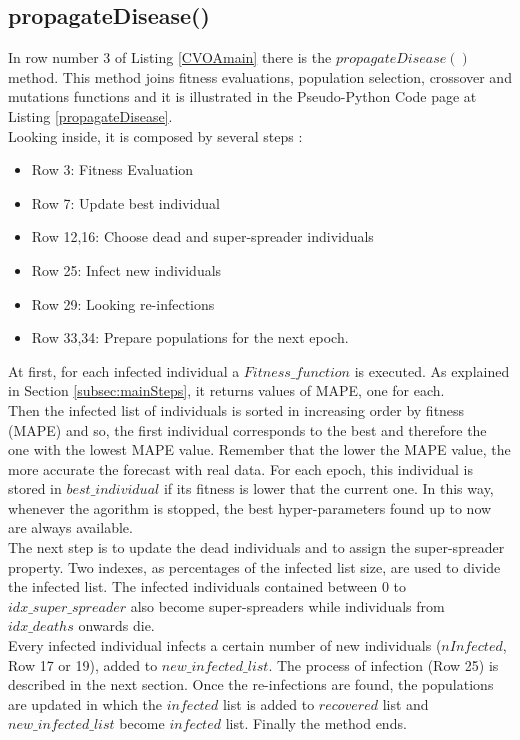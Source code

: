 \documentclass[letterpaper]{article}%
\begin{document}
\subsection{propagateDisease()}
In row number 3 of Listing \ref{CVOAmain} there is the $propagateDisease()$ method. This method joins fitness evaluations, population selection, crossover and mutations functions and it is illustrated in the Pseudo-Python Code page at Listing \ref{propagateDisease}.\\
Looking inside, it is composed by several steps :
\begin{itemize}
\item Row 3: Fitness Evaluation  
\item Row 7: Update best individual
\item Row 12,16: Choose dead and super-spreader individuals
\item Row 25: Infect new individuals
\item Row 29: Looking re-infections
\item Row 33,34: Prepare populations for the next epoch.
\end{itemize}
At first, for each infected individual a $Fitness\_function$ is executed. As explained in Section \ref{subsec:mainSteps}, it returns values of MAPE, one for each.\\ %
Then the infected list of individuals is sorted in increasing order by fitness (MAPE) and so, the first individual corresponds to the best and therefore the one with the lowest MAPE value. Remember that the lower the MAPE value, the more accurate the forecast with real data.
For each epoch, this individual is stored in $best\_individual$ if its fitness is lower that the current one. In this way, whenever the agorithm is stopped, the best hyper-parameters found up to now are always available.\\
The next step is to update the dead individuals and to assign the super-spreader property. Two indexes, as percentages of the infected list size, are used to divide the infected list. The infected individuals contained between $0$ to $idx\_super\_spreader$ also become super-spreaders while individuals from $idx\_deaths$ onwards die.\\
Every infected individual infects a certain number of new individuals ($nInfected$, Row 17 or 19), added to $new\_infected\_list$. The process of infection (Row 25) is described in the next section. Once the re-infections are found, the populations are updated in which the $infected$ list is added to $recovered$ list and $new\_infected\_list$ become $infected$ list. Finally the method ends.
\end{document}

